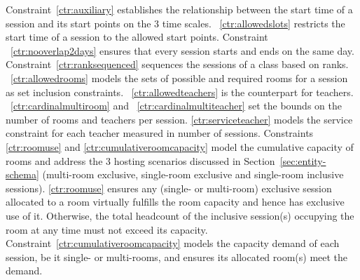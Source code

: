 Constraint~\ref{ctr:auxiliary} establishes the relationship between the start time of a session and its start points on the 3 time scales.
~\ref{ctr:allowedslots} restricts the start time of a session to the allowed start points.
Constraint ~\ref{ctr:nooverlap2days} ensures that every session starts and ends on the same day.
Constraint~\ref{ctr:ranksequenced} sequences the sessions of a class based on ranks. 
~\ref{ctr:allowedrooms} models the sets of possible and required rooms for a session as set inclusion constraints.
~\ref{ctr:allowedteachers} is the counterpart for teachers.
~\ref{ctr:cardinalmultiroom} and ~\ref{ctr:cardinalmultiteacher} set the bounds on the number of rooms and teachers per session.  
\ref{ctr:serviceteacher} models the service constraint for each teacher measured in number of sessions.
Constraints \ref{ctr:roomuse} and \ref{ctr:cumulativeroomcapacity}
model the cumulative capacity of rooms
and address the 3 hosting scenarios discussed in Section~\ref{sec:entity-schema}
(multi-room exclusive, single-room exclusive and single-room inclusive sessions).
\ref{ctr:roomuse} ensures any (single- or multi-room) exclusive session allocated to a room
virtually fulfills the room capacity and hence has exclusive use of it.
Otherwise, the total headcount of the inclusive session(s) occupying the room at any time must not exceed its capacity. 
Constraint~\ref{ctr:cumulativeroomcapacity} models the capacity demand of each session, be it single- or multi-rooms, and ensures its allocated room(s) meet the demand.

